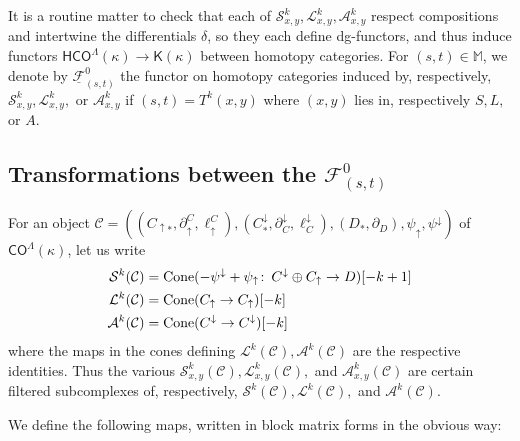 \documentclass[11pt]{amsart}
\theoremstyle{definition}
\theoremstyle{remark}
\numberwithin{equation}{section}
\def\co{\colon\thinspace}
\begin{document}
It is a routine matter to check that each of $\mathcal{S}^{k}_{x,y},\mathcal{L}^{k}_{x,y},\mathcal{A}^{k}_{x,y}$ respect compositions and intertwine the differentials $\delta$, so they each define dg-functors, and thus induce functors $\mathsf{HCO}^{\Lambda}(\kappa)\to \mathsf{K}(\kappa)$ between homotopy categories. For $(s,t) \in\mathbb{M}$, we denote by $\underline{\mathcal{F}}^{0}_{(s,t)}$ the functor on homotopy categories induced by, respectively, $\mathcal{S}^{k}_{x,y},\mathcal{L}^{k}_{x,y},$ or $\mathcal{A}^{k}_{x,y}$ if $(s,t)=T^k(x,y)$ where $(x,y)$ lies in, respectively $S,L,$ or $A$. %

\subsection{Transformations between the $\mathcal{F}^{0}_{(s,t)}$}\label{transf}

For an object $\mathcal{C}=\left((C_{\uparrow *},\partial_{\uparrow}^C,\ell_{\uparrow}^C),(C^{\downarrow}_{*},\partial^{\downarrow}_C,\ell^{\downarrow}_C),(D_*,\partial_D),\psi_{\uparrow},\psi^{\downarrow}\right)$ of $\mathsf{CO}^{\Lambda}(\kappa)$, let us write \begin{align*} \mathcal{S}^k(\mathcal{C})&=\mathrm{Cone}(-\psi^{\downarrow}+\psi_{\uparrow}\co C^{\downarrow}\oplus C_{\uparrow}\to D)[-k+1] \\ \mathcal{L}^{k}(\mathcal{C})&=\mathrm{Cone}(C_{\uparrow}\to C_{\uparrow})[-k] \\ \mathcal{A}^k(\mathcal{C})&=\mathrm{Cone}(C^{\downarrow}\to C^{\downarrow})[-k] \end{align*}
where the maps in the cones defining $\mathcal{L}^k(\mathcal{C}),\mathcal{A}^k(\mathcal{C})$ are the respective identities.  Thus the various $\mathcal{S}^{k}_{x,y}(\mathcal{C}),\mathcal{L}^{k}_{x,y}(\mathcal{C}),$ and $\mathcal{A}^{k}_{x,y}(\mathcal{C})$ are certain filtered subcomplexes of, respectively, $\mathcal{S}^{k}(\mathcal{C}),\mathcal{L}^{k}(\mathcal{C}),$ and $\mathcal{A}^k(\mathcal{C})$.

We define the following maps, written in block matrix forms in the obvious way:
\end{document}
